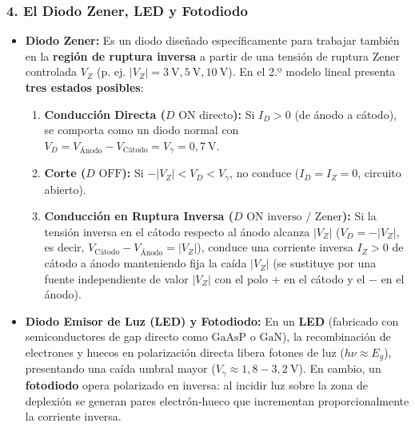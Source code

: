 \subsubsection{4. El Diodo Zener, LED y Fotodiodo}
\begin{itemize}[leftmargin=*]
    \item \textbf{Diodo Zener:} Es un diodo diseñado específicamente para trabajar también en la \textbf{región de ruptura inversa} a partir de una tensión de ruptura Zener controlada $V_Z$ (p. ej. $|V_Z| = 3\ \si{\volt}, 5\ \si{\volt}, 10\ \si{\volt}$). En el 2.º modelo lineal presenta \textbf{tres estados posibles}:
    \begin{enumerate}
        \item \textbf{Conducción Directa ($D\text{ ON directo}$):} Si $I_D > 0$ (de ánodo a cátodo), se comporta como un diodo normal con $V_D = V_{\text{Ánodo}} - V_{\text{Cátodo}} = V_\gamma = 0{,}7\ \si{\volt}$.
        \item \textbf{Corte ($D\text{ OFF}$):} Si $-|V_Z| < V_D < V_\gamma$, no conduce ($I_D = I_Z = 0$, circuito abierto).
        \item \textbf{Conducción en Ruptura Inversa ($D\text{ ON inverso / Zener}$):} Si la tensión inversa en el cátodo respecto al ánodo alcanza $|V_Z|$ ($V_D = -|V_Z|$, es decir, $V_{\text{Cátodo}} - V_{\text{Ánodo}} = |V_Z|$), conduce una corriente inversa $I_Z > 0$ de cátodo a ánodo manteniendo fija la caída $|V_Z|$ (se sustituye por una fuente independiente de valor $|V_Z|$ con el polo $+$ en el cátodo y el $-$ en el ánodo).
    \end{enumerate}
    \item \textbf{Diodo Emisor de Luz (LED) y Fotodiodo:} En un \textbf{LED} (fabricado con semiconductores de gap directo como $\text{GaAsP}$ o $\text{GaN}$), la recombinación de electrones y huecos en polarización directa libera fotones de luz ($h\nu \approx E_g$), presentando una caída umbral mayor ($V_\gamma \approx 1{,}8 - 3{,}2\ \si{\volt}$). En cambio, un \textbf{fotodiodo} opera polarizado en inversa: al incidir luz sobre la zona de deplexión se generan pares electrón-hueco que incrementan proporcionalmente la corriente inversa.
\end{itemize}

